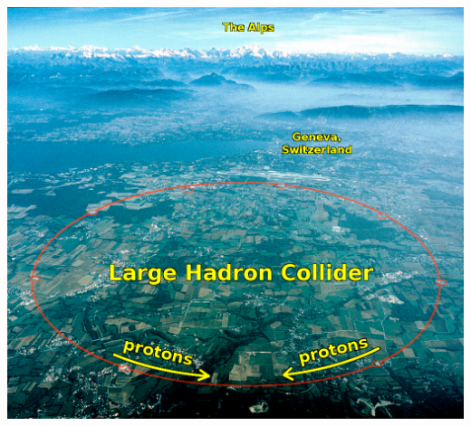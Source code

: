 \documentclass[compress]{beamer}
\begin{document}
\begin{frame}

\begin{center}
\includegraphics[width=0.9\linewidth]{cernpanorama.jpg}
\end{center}

\end{frame}
\end{document}
